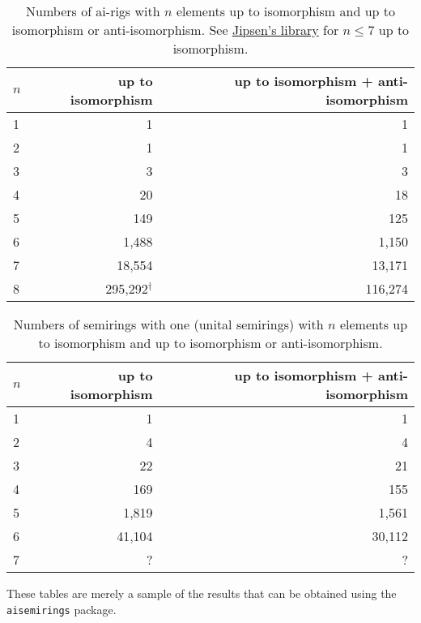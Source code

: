 \documentclass{article}
\theoremstyle{definition}
\begin{document}
\begin{table}[ht]
    \centering
    \begin{tabular}{l|r|r}
      \toprule
      $n$ & up to isomorphism & up to isomorphism + anti-isomorphism \\
      \midrule
      1 & 1         & 1      \\
      2 & 1         & 1      \\
      3 & 3         & 3      \\
      4 & 20        & 18     \\
      5 & 149       & 125    \\
      6 & 1,488     & 1,150  \\
      7 & 18,554    & 13,171 \\
      8 & 295,292$^\dagger$   & 116,274      \\
    \end{tabular}
    \caption{Numbers of ai-rigs with $n$ elements up to isomorphism and up
    to isomorphism or anti-isomorphism. See \href{https://math.chapman.edu/~jipsen/structures/doku.php?id=idempotent_semirings_with_identity_and_zero\#finite_members}{Jipsen's library} for \(n\leq7\) up to isomorphism.}
    \label{tab:ai-rigs}
\end{table}

\begin{table}[h]
    \centering
    \begin{tabular}{l|r|r}
      \toprule
      $n$ & up to isomorphism & up to isomorphism + anti-isomorphism \\
      \midrule
      1 & 1         & 1      \\
      2 & 4         & 4      \\
      3 & 22        & 21     \\
      4 & 169       & 155    \\
      5 & 1,819     & 1,561  \\
      6 & 41,104    & 30,112 \\
      7 & ?         & ?      \\
    \end{tabular}
    \caption{Numbers of semirings with one (unital semirings) with $n$ elements up to isomorphism and up to isomorphism or anti-isomorphism.}
    \label{tab:unital-semirings}
\end{table}

These tables are merely a sample of the results that can be obtained using the \texttt{aisemirings} package.
\end{document}
